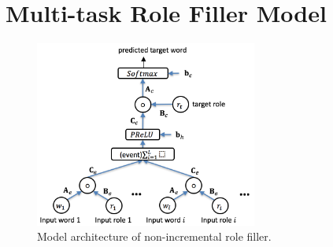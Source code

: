 \documentclass[a4paper]{article}
\begin{document}
\newpage
\section{Multi-task Role Filler Model} \label{sec:mtrf}


\begin{figure}[t]
\centering
\includegraphics[width=0.65\textwidth]{NNRF.png}
\caption{\label{fig:NNRF} Model architecture of non-incremental role filler.}
\end{figure}
\end{document}
